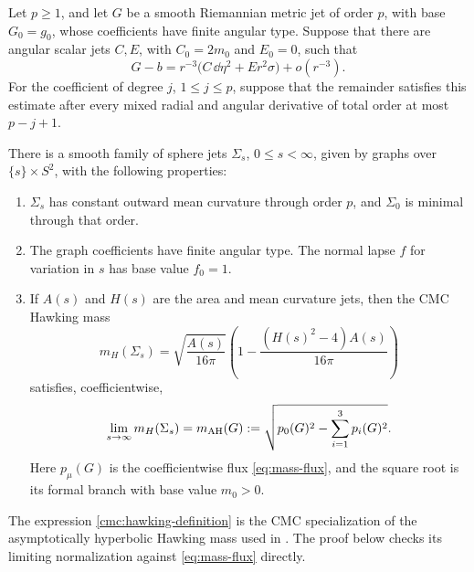 \begin{proposition}\label{prop:cmc-jets}
Let \(p\geq1\), and let \(G\) be a smooth Riemannian metric jet of order
\(p\), with base \(G_0=g_0\), whose coefficients have finite angular type.
Suppose that there are angular scalar jets \(C,E\), with
\(C_0=2m_0\) and \(E_0=0\), such that
\begin{equation}\label{cmc:metric-asymptotics}
 G-b=r^{-3}\bigl(C\,\dd\eta^2+E r^2\sigma\bigr)+o(r^{-3}).
\end{equation}
For the coefficient of degree \(j\), \(1\leq j\leq p\), suppose that
the remainder satisfies this estimate after every mixed radial and
angular derivative of total order at most \(p-j+1\).

There is a smooth family of sphere jets
\(\Sigma_s\), \(0\leq s<\infty\), given by graphs over
\(\{s\}\times S^2\), with the following properties:
\begin{enumerate}
 \item \(\Sigma_s\) has constant outward mean curvature through order
 \(p\), and \(\Sigma_0\) is minimal through that order.
 \item The graph coefficients have finite angular type.  The normal
 lapse \(f\) for variation in \(s\) has base value \(f_0=1\).
 \item If \(A(s)\) and \(H(s)\) are the area and mean curvature jets,
 then the CMC Hawking mass
 \begin{equation}\label{cmc:hawking-definition}
 m_H(\Sigma_s)=
 \sqrt{\frac{A(s)}{16\pi}}
 \left(1-\frac{(H(s)^2-4)A(s)}{16\pi}\right)
 \end{equation}
 satisfies, coefficientwise,
 \begin{equation}\label{cmc:hawking-limit}
 \lim_{s\to\infty}m_H(\Sigma_s)
 =m_{\mathrm{AH}}(G)
 :=\sqrt{p_0(G)^2-\sum_{i=1}^3p_i(G)^2}.
 \end{equation}
 Here \(p_\mu(G)\) is the coefficientwise flux \eqref{eq:mass-flux},
 and the square root is its formal branch with base value
 \(m_0>0\).
\end{enumerate}
\end{proposition}

The expression \eqref{cmc:hawking-definition} is the CMC specialization
of the asymptotically hyperbolic Hawking mass used in
\cite[Equation~(2)]{Ambrozio2015}.  The proof below checks its limiting
normalization against \eqref{eq:mass-flux} directly.

